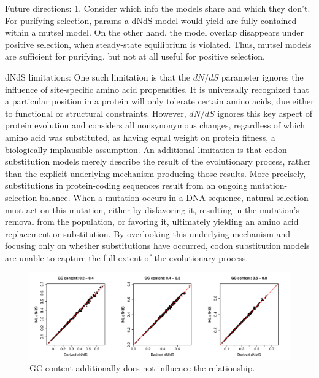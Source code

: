 \documentclass[11pt]{article}
\begin{document}
	
	

Future directions:
1. Consider which info the models share and which they don't. For purifying selection, params a dNdS model would yield are fully contained within a mutsel model. On the other hand, the model overlap disappears under positive selection, when steady-state equilibrium is violated. Thus, mutsel models are sufficient for purifying, but not at all useful for positive selection.

dNdS limitations:
One such limitation is that the $dN/dS$ parameter ignores the influence of site-specific amino acid propensities.  It is universally recognized that a particular position in a protein will only tolerate certain amino acids, due either to functional or structural constraints. However, $dN/dS$ ignores this key aspect of protein evolution and considers all nonsynonymous changes, regardless of which amino acid was substituted, as having equal weight on protein fitness, a biologically implausible assumption. An additional limitation is that codon-substitution models merely describe the result of the evolutionary process, rather than the explicit underlying mechanism producing those results. More precisely, substitutions in protein-coding sequences result from an ongoing mutation-selection balance. When a mutation occurs in a DNA sequence, natural selection must act on this mutation, either by disfavoring it, resulting in the mutation's removal from the population, or favoring it, ultimately yielding an amino acid replacement or substitution. By overlooking this underlying mechanism and focusing only on whether substitutions have occurred, codon substitution models are unable to capture the full extent of the evolutionary process. 


	
\newpage

	


\bigskip

\begin{figure}[H]
\centerline{\includegraphics[width=6in]{figures/gc_2beta.pdf}}
\caption{\label{kappa} GC content additionally does not influence the relationship.}
\end{figure}
\end{document}
